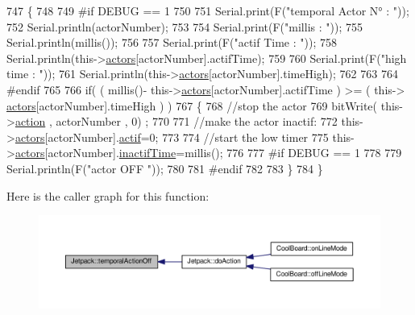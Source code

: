 \begin{DoxyCode}
747 \{
748 
749 \textcolor{preprocessor}{#if DEBUG == 1}
750     
751     Serial.print(F(\textcolor{stringliteral}{"temporal Actor N° : "}));
752     Serial.println(actorNumber);
753 
754     Serial.print(F(\textcolor{stringliteral}{"millis : "}));
755     Serial.println(millis());
756 
757     Serial.print(F(\textcolor{stringliteral}{"actif Time : "}));
758     Serial.println(this->\hyperlink{class_jetpack_a7e16d2f97837f9712a2e6de1c50d99db}{actors}[actorNumber].actifTime);
759 
760     Serial.print(F(\textcolor{stringliteral}{"high time : "}));
761     Serial.println(this->\hyperlink{class_jetpack_a7e16d2f97837f9712a2e6de1c50d99db}{actors}[actorNumber].timeHigh);
762 
763 
764 \textcolor{preprocessor}{#endif}
765     
766     \textcolor{keywordflow}{if}( ( millis()- this->\hyperlink{class_jetpack_a7e16d2f97837f9712a2e6de1c50d99db}{actors}[actorNumber].actifTime  ) >= (  this->
      \hyperlink{class_jetpack_a7e16d2f97837f9712a2e6de1c50d99db}{actors}[actorNumber].timeHigh  ) )
767     \{
768         \textcolor{comment}{//stop the actor}
769         bitWrite( this->\hyperlink{class_jetpack_aca3142925a7b0834b34ae91d26af7765}{action} , actorNumber , 0) ;
770 
771         \textcolor{comment}{//make the actor inactif:}
772         this->\hyperlink{class_jetpack_a7e16d2f97837f9712a2e6de1c50d99db}{actors}[actorNumber].\hyperlink{struct_jetpack_1_1state_aa177541689bbaea21a4650a083b0df77}{actif}=0;
773 
774         \textcolor{comment}{//start the low timer}
775         this->\hyperlink{class_jetpack_a7e16d2f97837f9712a2e6de1c50d99db}{actors}[actorNumber].\hyperlink{struct_jetpack_1_1state_aaf817b1f9e7a4d65b9e3ca4726b281f6}{inactifTime}=millis();
776 
777 \textcolor{preprocessor}{    #if DEBUG == 1 }
778 
779         Serial.println(F(\textcolor{stringliteral}{"actor OFF "}));
780     
781 \textcolor{preprocessor}{    #endif}
782                 
783     \}   
784 \}
\end{DoxyCode}
Here is the caller graph for this function\+:
\nopagebreak
\begin{figure}[H]
\begin{center}
\leavevmode
\includegraphics[width=350pt]{df/d1d/class_jetpack_a2991b302cd99bf89325f9b66b104d575_icgraph}
\end{center}
\end{figure}
\mbox{\label{class_jetpack_ad011d904f639accb5f94ef806846ef59}} 
